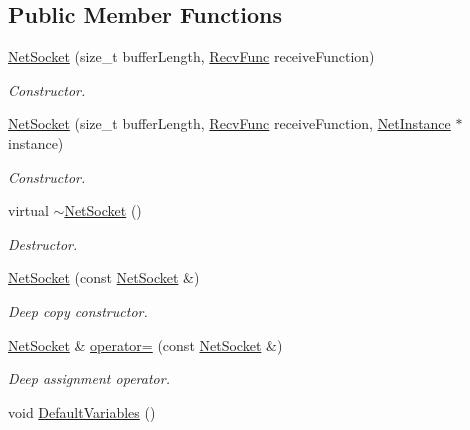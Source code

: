 \subsection*{Public Member Functions}
\begin{DoxyCompactItemize}
\item 
\hyperlink{class_net_socket_a0f3c63a94517b043d5c1b8c070852c60}{NetSocket} (size\_\-t bufferLength, \hyperlink{class_net_socket_a52b5f4de8d0a47fd8620f542b21c076c}{RecvFunc} receiveFunction)
\begin{DoxyCompactList}\small\item\em Constructor. \item\end{DoxyCompactList}\item 
\hyperlink{class_net_socket_ab916dbb4c1afa5078068eaef73274c92}{NetSocket} (size\_\-t bufferLength, \hyperlink{class_net_socket_a52b5f4de8d0a47fd8620f542b21c076c}{RecvFunc} receiveFunction, \hyperlink{class_net_instance}{NetInstance} $\ast$instance)
\begin{DoxyCompactList}\small\item\em Constructor. \item\end{DoxyCompactList}\item 
\hypertarget{class_net_socket_a3ebe4e1d8db6978255f48e1034d638a4}{
virtual \hyperlink{class_net_socket_a3ebe4e1d8db6978255f48e1034d638a4}{$\sim$NetSocket} ()}
\label{class_net_socket_a3ebe4e1d8db6978255f48e1034d638a4}

\begin{DoxyCompactList}\small\item\em Destructor. \item\end{DoxyCompactList}\item 
\hyperlink{class_net_socket_a505f592181260a75c7c5060021ac4201}{NetSocket} (const \hyperlink{class_net_socket}{NetSocket} \&)
\begin{DoxyCompactList}\small\item\em Deep copy constructor. \item\end{DoxyCompactList}\item 
\hyperlink{class_net_socket}{NetSocket} \& \hyperlink{class_net_socket_a703ac13a72d73c598c81372946097210}{operator=} (const \hyperlink{class_net_socket}{NetSocket} \&)
\begin{DoxyCompactList}\small\item\em Deep assignment operator. \item\end{DoxyCompactList}\item 
\hypertarget{class_net_socket_a900eb09b76f4098e67af95daf9e0b3b2}{
void \hyperlink{class_net_socket_a900eb09b76f4098e67af95daf9e0b3b2}{DefaultVariables} ()}
\label{class_net_socket_a900eb09b76f4098e67af95daf9e0b3b2}


\end{DoxyCompactItemize}
